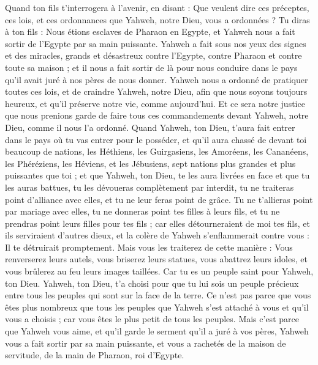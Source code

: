 \begin{multicols}{2}
Quand ton fils t'interrogera à l'avenir, en disant : Que veulent dire ces préceptes, ces lois, et ces ordonnances que Yahweh, notre Dieu, vous a ordonnées ?
Tu diras à ton fils : Nous étions esclaves de Pharaon en Egypte, et Yahweh nous a fait sortir de l'Egypte par sa main puissante.
Yahweh a fait sous nos yeux des signes et des miracles, grands et désastreux contre l'Egypte, contre Pharaon et contre toute sa maison ;
et il nous a fait sortir de là pour nous conduire dans le pays qu'il avait juré à nos pères de nous donner.
Yahweh nous a ordonné de pratiquer toutes ces lois, et de craindre Yahweh, notre Dieu, afin que nous soyons toujours heureux, et qu'il préserve notre vie, comme aujourd'hui.
Et ce sera notre justice que nous prenions garde de faire tous ces commandements devant Yahweh, notre Dieu, comme il nous l'a ordonné.
\VerseOne{}Quand Yahweh, ton Dieu, t'aura fait entrer dans le pays où tu vas entrer pour le posséder, et qu'il aura chassé de devant toi beaucoup de nations, les Héthiens, les Guirgasiens, les Amoréens, les Cananéens, les Phéréziens, les Héviens, et les Jébusiens, sept nations plus grandes et plus puissantes que toi ;
et que Yahweh, ton Dieu, te les aura livrées en face et que tu les auras battues, tu les dévoueras complètement par interdit, tu ne traiteras point d'alliance avec elles, et tu ne leur feras point de grâce.
Tu ne t'allieras point par mariage avec elles, tu ne donneras point tes filles à leurs fils, et tu ne prendras point leurs filles pour tes fils ;
car elles détourneraient de moi tes fils, et ils serviraient d'autres dieux, et la colère de Yahweh s'enflammerait contre vous : Il te détruirait promptement.
Mais vous les traiterez de cette manière : Vous renverserez leurs autels, vous briserez leurs statues, vous abattrez leurs idoles, et vous brûlerez au feu leurs images taillées.
Car tu es un peuple saint pour Yahweh, ton Dieu. Yahweh, ton Dieu, t'a choisi pour que tu lui sois un peuple précieux entre tous les peuples qui sont sur la face de la terre.
Ce n'est pas parce que vous êtes plus nombreux que tous les peuples que Yahweh s'est attaché à vous et qu'il vous a choisis ; car vous êtes le plus petit de tous les peuples.
Mais c'est parce que Yahweh vous aime, et qu'il garde le serment qu'il a juré à vos pères, Yahweh vous a fait sortir par sa main puissante, et vous a rachetés de la maison de servitude, de la main de Pharaon, roi d'Egypte.

\end{multicols}
